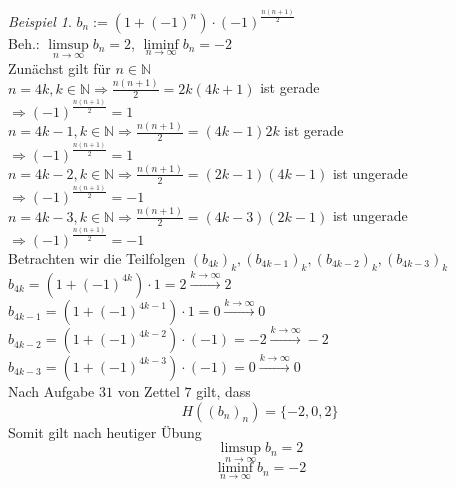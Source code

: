 \documentclass[12pt,a4paper,titlepage]{article} %
\theoremstyle{definition}
\theoremstyle{remark}
\newtheorem*{bsp}{Beispiel}
\newcommand{\N}{\mathbb{N}}
\newcommand{\limessup}[1]{\limsup \limits_{#1\rightarrow\infty}}
\newcommand{\limesinf}[1]{\liminf \limits_{#1\rightarrow\infty}}
\begin{document}
	\begin{bsp}
		\(b_n := (1 + (-1)^n) \cdot (-1)^{\frac{n(n+1)}{2}} \)\\
		Beh.: \(\limessup{n} b_n = 2\), \(\limesinf{n} b_n = -2\)\\
		Zunächst gilt für \(n \in \N\)\\
		\(n = 4k, k \in \N \Rightarrow \frac{n(n+1)}{2} = 2k(4k+1)\) ist gerade\\
		\(\Rightarrow (-1)^{\frac{n(n+1)}{2}} = 1\)\\
		\(n = 4k - 1, k \in \N \Rightarrow \frac{n(n+1)}{2} = (4k-1)2k\) ist gerade\\
		\(\Rightarrow (-1)^{\frac{n(n+1)}{2}} = 1\)\\
		\(n = 4k - 2, k \in \N \Rightarrow \frac{n(n+1)}{2} = (2k-1)(4k-1)\) ist ungerade\\
		\(\Rightarrow (-1)^{\frac{n(n+1)}{2}} = -1\)\\
		\(n = 4k - 3, k \in \N \Rightarrow \frac{n(n+1)}{2} = (4k-3)(2k-1)\) ist ungerade\\
		\(\Rightarrow (-1)^{\frac{n(n+1)}{2}} = -1\)\\
		Betrachten wir die Teilfolgen \((b_{4k})_k, (b_{4k-1})_k, (b_{4k-2})_k, (b_{4k-3})_k\)\\
		\(b_{4k} = (1 + (-1)^{4k}) \cdot 1 = 2 \overset{k \rightarrow \infty}{\rightarrow} 2\)\\
		\(b_{4k-1} = (1 + (-1)^{4k-1}) \cdot 1 = 0 \overset{k \rightarrow \infty}{\rightarrow} 0\)\\
		\(b_{4k-2} = (1 + (-1)^{4k-2}) \cdot (-1) = -2 \overset{k \rightarrow \infty}{\rightarrow} -2\)\\
		\(b_{4k-3} = (1 + (-1)^{4k-3}) \cdot (-1) = 0 \overset{k \rightarrow \infty}{\rightarrow} 0\)\\
		Nach Aufgabe \(31\) von Zettel \(7\) gilt, dass
		\[H((b_n)_n) = \{-2,0,2\}\]
		Somit gilt nach heutiger Übung\\
		\[\limessup{n} b_n = 2\]
		\[\limesinf{n} b_n = -2\]
	\end{bsp}
\end{document}
